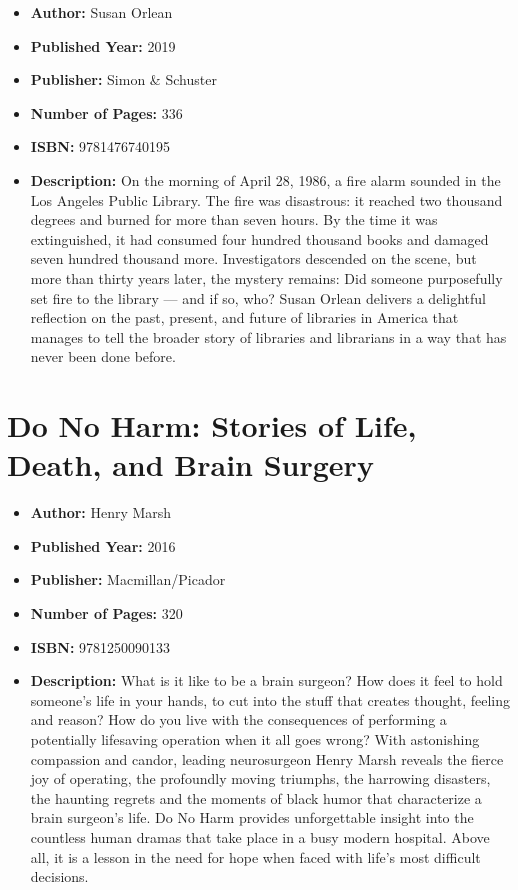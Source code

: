 \documentclass{tufte-handout}
\begin{document}
\begin{itemize}
    \item[] \textbf{Author:} Susan Orlean 
    \item[] \textbf{Published Year:} 2019
    \item[] \textbf{Publisher:} Simon \& Schuster
    \item[] \textbf{Number of Pages:} 336    
    \item[] \textbf{ISBN:} 9781476740195
    \item[] \textbf{Description:} On the morning of April 28, 1986, a fire alarm sounded in the Los Angeles Public Library. The fire was disastrous: it reached two thousand degrees and burned for more than seven hours. By the time it was extinguished, it had consumed four hundred thousand books and damaged seven hundred thousand more. Investigators descended on the scene, but more than thirty years later, the mystery remains: Did someone purposefully set fire to the library --- and if so, who? Susan Orlean delivers a delightful reflection on the past, present, and future of libraries in America that manages to tell the broader story of libraries and librarians in a way that has never been done before.
\end{itemize}

\section*{Do No Harm: Stories of Life, Death, and Brain Surgery}

\begin{itemize}
    \item[] \textbf{Author:} Henry Marsh 
    \item[] \textbf{Published Year:} 2016
    \item[] \textbf{Publisher:} Macmillan/Picador
    \item[] \textbf{Number of Pages:} 320    
    \item[] \textbf{ISBN:} 9781250090133
    \item[] \textbf{Description:} What is it like to be a brain surgeon? How does it feel to hold someone’s life in your hands, to cut into the stuff that creates thought, feeling and reason? How do you live with the consequences of performing a potentially lifesaving operation when it all goes wrong? With astonishing compassion and candor, leading neurosurgeon Henry Marsh reveals the fierce joy of operating, the profoundly moving triumphs, the harrowing disasters, the haunting regrets and the moments of black humor that characterize a brain surgeon’s life. Do No Harm provides unforgettable insight into the countless human dramas that take place in a busy modern hospital. Above all, it is a lesson in the need for hope when faced with life’s most difficult decisions.
\end{itemize}
\end{document}
